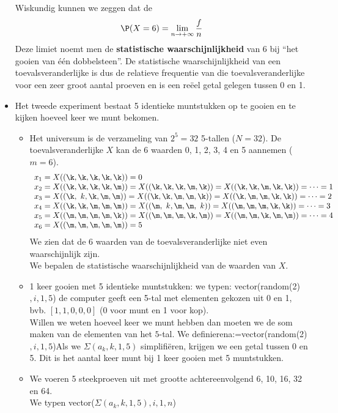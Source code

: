 \begin{small}
\begin{itemize}
Wiskundig kunnen we zeggen dat de 
$$\P(X=6)=\lim_{n\rightarrow +\infty}\frac{f}{n}$$
Deze limiet noemt men
de {\bf statistische waarschijnlijkheid} van 6 bij ``het gooien van \'e\'en dobbelsteen''. 
 De statistische waarschijnlijkheid van een toevalsveranderlijke is dus de relatieve frequentie van die toevalsveranderlijke voor een
zeer groot aantal proeven en is een re\" eel getal  gelegen tussen 0 en 1.
\newpage
\item
Het tweede experiment bestaat 5 identieke muntstukken op te gooien en te kijken hoeveel keer we munt bekomen. 
\begin{itemize}
\item 
Het universum is de verzameling van  $2^5=32$ 5-tallen ($N=32$).
De toevalsveranderlijke $X$ kan de 6 waarden 0, 1, 2, 3, 4 en 5 aannemen ($m=6$).
\[\begin{array}{l}
x_1=X((\k,\k,\k,\k, \k))=0\\
x_2=X((\k,\k,\k, \k,\m))=X(( \k, \k, \k, \m, \k))=X(( \k, \k, \m, \k, \k))=\cdots=1\\
x_3=X(( \k, \ k, \k, \m, \m))=X(( \k, \k, \m, \m, \k))=X(( \k, \m, \m, \k, \k))=\cdots=2\\
x_4=X(( \k,  \k, \m, \m, \m))=X(( \m,\ k, \m, \m,\ k))=X(( \m, \m,\m,\k, \k))=\cdots=3\\
x_5=X(( \m,  \m, \m,  \m, \k))=X((\m,\m,\m,\k,\m))=X((\m,\m,\k,\m,\m))=\cdots=4\\
x_6=X((\m,\m,\m,\m,\m))=5
\end{array}\]
 We zien dat de 6 waarden van de toevalsveranderlijke niet even waarschijnlijk zijn. \\
We bepalen de statistische waarschijnlijkheid van de  waarden van $X$.
\item
1 keer gooien met 5 identieke muntstukken: we typen: \bderive  vector(random(2)$,i,1,5$)\ederive 
de computer geeft een 5-tal met elementen gekozen uit 0 en 1, bvb. $[1,1,0,0,0]$ (0 voor munt en 1 voor kop).\\
 Willen we weten hoeveel keer we munt hebben dan moeten we de som maken van de elementen van het $5$-tal. We definieren\bderive  a:=vector(random(2)$,i,1,5$)\ederive Als we  \bderive $\Sigma(a_k,k,1,5)$ \ederive
 simplifi\"eren, krijgen we een getal tussen 0 en 5. Dit is het aantal keer munt bij 1 keer gooien met 5 muntstukken.
\item We voeren 5 steekproeven uit met grootte achtereenvolgend 6, 10, 16, 32 en 64.\\ We typen
 \bderive  vector($\Sigma(a_k,k,1,5),i,1,n$) \label{vector}\ederive

\end{itemize}
\end{itemize}
\end{small}
